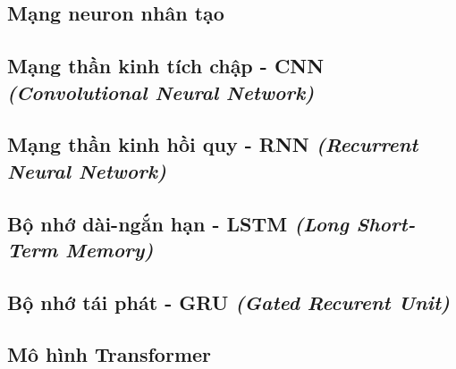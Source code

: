 \subsection{Mạng neuron nhân tạo}


\subsection{Mạng thần kinh tích chập - CNN \textit{(Convolutional Neural Network)}}


\subsection{Mạng thần kinh hồi quy - RNN \textit{(Recurrent Neural Network)}}


\subsection{Bộ nhớ dài-ngắn hạn - LSTM \textit{(Long Short-Term Memory)}}


\subsection{Bộ nhớ tái phát - GRU \textit{(Gated Recurent Unit)}}


\subsection{Mô hình Transformer}
